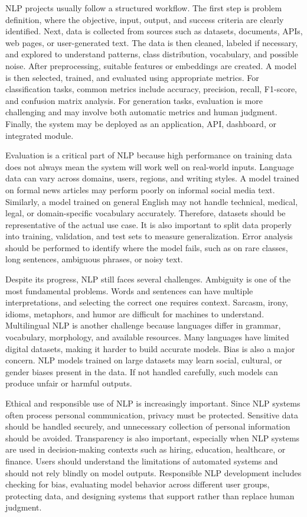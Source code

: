 \documentclass[11pt]{article}
\begin{document}
NLP projects usually follow a structured workflow. The first step is problem definition, where the objective, input, output, and success criteria are clearly identified. Next, data is collected from sources such as datasets, documents, APIs, web pages, or user-generated text. The data is then cleaned, labeled if necessary, and explored to understand patterns, class distribution, vocabulary, and possible noise. After preprocessing, suitable features or embeddings are created. A model is then selected, trained, and evaluated using appropriate metrics. For classification tasks, common metrics include accuracy, precision, recall, F1-score, and confusion matrix analysis. For generation tasks, evaluation is more challenging and may involve both automatic metrics and human judgment. Finally, the system may be deployed as an application, API, dashboard, or integrated module.

Evaluation is a critical part of NLP because high performance on training data does not always mean the system will work well on real-world inputs. Language data can vary across domains, users, regions, and writing styles. A model trained on formal news articles may perform poorly on informal social media text. Similarly, a model trained on general English may not handle technical, medical, legal, or domain-specific vocabulary accurately. Therefore, datasets should be representative of the actual use case. It is also important to split data properly into training, validation, and test sets to measure generalization. Error analysis should be performed to identify where the model fails, such as on rare classes, long sentences, ambiguous phrases, or noisy text.

Despite its progress, NLP still faces several challenges. Ambiguity is one of the most fundamental problems. Words and sentences can have multiple interpretations, and selecting the correct one requires context. Sarcasm, irony, idioms, metaphors, and humor are difficult for machines to understand. Multilingual NLP is another challenge because languages differ in grammar, vocabulary, morphology, and available resources. Many languages have limited digital datasets, making it harder to build accurate models. Bias is also a major concern. NLP models trained on large datasets may learn social, cultural, or gender biases present in the data. If not handled carefully, such models can produce unfair or harmful outputs.

Ethical and responsible use of NLP is increasingly important. Since NLP systems often process personal communication, privacy must be protected. Sensitive data should be handled securely, and unnecessary collection of personal information should be avoided. Transparency is also important, especially when NLP systems are used in decision-making contexts such as hiring, education, healthcare, or finance. Users should understand the limitations of automated systems and should not rely blindly on model outputs. Responsible NLP development includes checking for bias, evaluating model behavior across different user groups, protecting data, and designing systems that support rather than replace human judgment.
\end{document}
